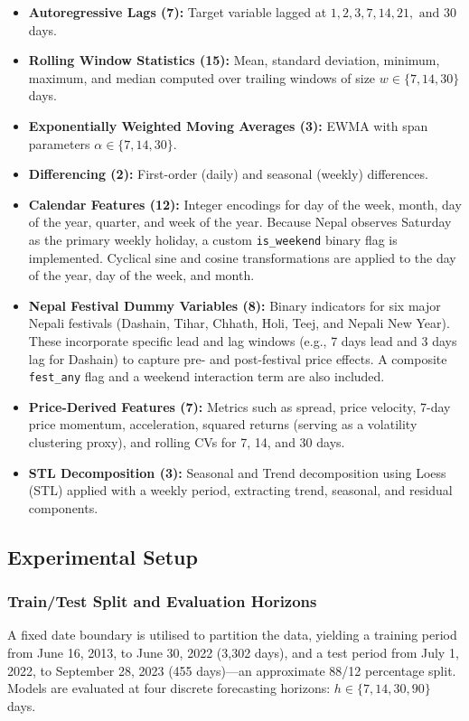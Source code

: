 \begin{itemize}
    \item \textbf{Autoregressive Lags (7):} Target variable lagged at $1, 2, 3, 7, 14, 21, \text{ and } 30$ days.
    \item \textbf{Rolling Window Statistics (15):} Mean, standard deviation, minimum, maximum, and median computed over trailing windows of size $w \in \{7, 14, 30\}$ days.
    \item \textbf{Exponentially Weighted Moving Averages (3):} EWMA with span parameters $\alpha \in \{7, 14, 30\}$.
    \item \textbf{Differencing (2):} First-order (daily) and seasonal (weekly) differences.
    \item \textbf{Calendar Features (12):} Integer encodings for day of the week, month, day of the year, quarter, and week of the year. Because Nepal observes Saturday as the primary weekly holiday, a custom \texttt{is\_weekend} binary flag is implemented. Cyclical sine and cosine transformations are applied to the day of the year, day of the week, and month.
    \item \textbf{Nepal Festival Dummy Variables (8):} Binary indicators for six major Nepali festivals (Dashain, Tihar, Chhath, Holi, Teej, and Nepali New Year). These incorporate specific lead and lag windows (e.g., 7 days lead and 3 days lag for Dashain) to capture pre- and post-festival price effects. A composite \texttt{fest\_any} flag and a weekend interaction term are also included.
    \item \textbf{Price-Derived Features (7):} Metrics such as spread, price velocity, 7-day price momentum, acceleration, squared returns (serving as a volatility clustering proxy), and rolling CVs for 7, 14, and 30 days.
    \item \textbf{STL Decomposition (3):} Seasonal and Trend decomposition using Loess (STL) applied with a weekly period, extracting trend, seasonal, and residual components.
\end{itemize}

\subsection{Experimental Setup}

\subsubsection{Train/Test Split and Evaluation Horizons}
A fixed date boundary is utilised to partition the data, yielding a training period from June 16, 2013, to June 30, 2022 (3,302 days), and a test period from July 1, 2022, to September 28, 2023 (455 days)---an approximate 88/12 percentage split. Models are evaluated at four discrete forecasting horizons: $h \in \{7, 14, 30, 90\}$ days.

